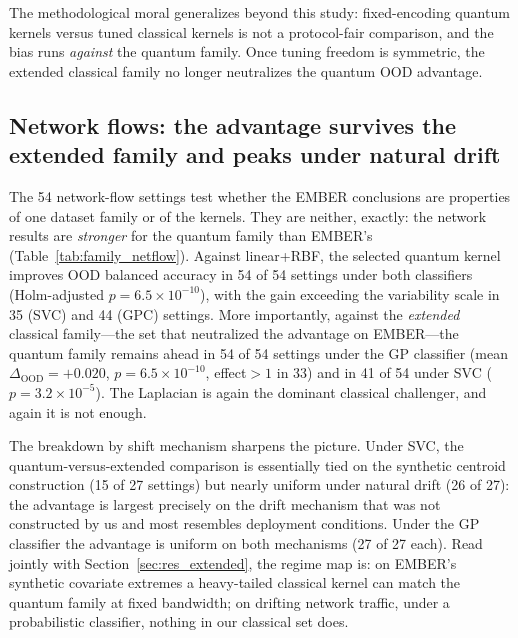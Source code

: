 \documentclass[journal]{IEEEtran}
\begin{document}
The methodological moral generalizes beyond this study: fixed-encoding quantum kernels versus tuned classical kernels is not a protocol-fair comparison, and the bias runs \emph{against} the quantum family. Once tuning freedom is symmetric, the extended classical family no longer neutralizes the quantum OOD advantage.

\subsection{Network flows: the advantage survives the extended family and peaks under natural drift}
\label{sec:res_netflow}

The 54 network-flow settings test whether the EMBER conclusions are properties of one dataset family or of the kernels. They are neither, exactly: the network results are \emph{stronger} for the quantum family than EMBER's (Table~\ref{tab:family_netflow}). Against linear+RBF, the selected quantum kernel improves OOD balanced accuracy in 54 of 54 settings under both classifiers (Holm-adjusted $p=6.5\times10^{-10}$), with the gain exceeding the variability scale in 35 (SVC) and 44 (GPC) settings. More importantly, against the \emph{extended} classical family---the set that neutralized the advantage on EMBER---the quantum family remains ahead in 54 of 54 settings under the GP classifier (mean $\Delta_{\mathrm{OOD}}=+0.020$, $p=6.5\times10^{-10}$, effect$>1$ in 33) and in 41 of 54 under SVC ($p=3.2\times10^{-5}$). The Laplacian is again the dominant classical challenger, and again it is not enough.

The breakdown by shift mechanism sharpens the picture. Under SVC, the quantum-versus-extended comparison is essentially tied on the synthetic centroid construction (15 of 27 settings) but nearly uniform under natural drift (26 of 27): the advantage is largest precisely on the drift mechanism that was not constructed by us and most resembles deployment conditions. Under the GP classifier the advantage is uniform on both mechanisms (27 of 27 each). Read jointly with Section~\ref{sec:res_extended}, the regime map is: on EMBER's synthetic covariate extremes a heavy-tailed classical kernel can match the quantum family at fixed bandwidth; on drifting network traffic, under a probabilistic classifier, nothing in our classical set does.
\end{document}
